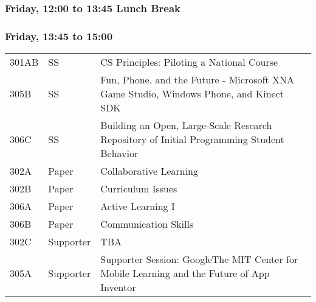 \subsubsection*{Friday, 12:00 to 13:45  Lunch Break}



\subsubsection*{Friday, 13:45 to 15:00}
\begin{tabular*}{5in}{@{}p{0.5in}@{}p{0.75in}@{}p{3.75in}}

301AB & SS & CS Principles:  Piloting a National Course \\

305B & SS & Fun, Phone, and the Future - Microsoft XNA Game Studio, Windows Phone, and Kinect SDK \\

306C & SS & Building an Open, Large-Scale Research Repository of Initial Programming Student Behavior \\

302A & Paper & Collaborative Learning \\

302B & Paper & Curriculum Issues \\

306A & Paper & Active Learning I \\

306B & Paper & Communication Skills \\

302C & Supporter & TBA \\

305A & Supporter & Supporter Session: GoogleThe MIT Center for Mobile Learning and the Future of App Inventor 
\end{tabular*}

